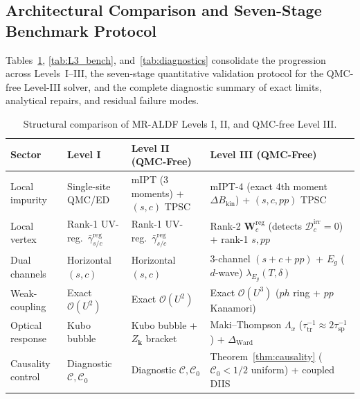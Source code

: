 \documentclass[11pt,a4paper]{article}
\numberwithin{equation}{section}
\theoremstyle{plain}
\theoremstyle{definition}
\providecommand{\vk}{\mathbf{k}}
\begin{document}
\subsection{Architectural Comparison and Seven-Stage Benchmark Protocol}
\label{sec:benchmarks}

Tables~\ref{tab:L3_compare}, \ref{tab:L3_bench}, and~\ref{tab:diagnostics} consolidate
the progression across Levels~I--III, the seven-stage quantitative validation protocol
for the QMC-free Level-III solver, and the complete diagnostic summary of exact limits,
analytical repairs, and residual failure modes.

\begin{table}[htbp]
\centering
\renewcommand{\arraystretch}{1.20}
\caption{Structural comparison of MR-ALDF Levels I, II, and QMC-free Level III.}
\label{tab:L3_compare}
\vspace{0.4em}
\small
\begin{tabular}{p{2.6cm}p{3.2cm}p{3.9cm}p{4.4cm}}
\hline\hline
\textbf{Sector} & \textbf{Level I} & \textbf{Level II (QMC-Free)} & \textbf{Level III (QMC-Free)} \\
\hline
Local impurity & Single-site QMC/ED & mIPT (3 moments) + $(s,c)$ TPSC
    & mIPT-4 (exact 4th moment $\Delta B_{\mathrm{kin}}$) + $(s,c,pp)$ TPSC \\
Local vertex & Rank-1 UV-reg.\ $\bar{\gamma}_{s/c}^{\mathrm{reg}}$
    & Rank-1 UV-reg.\ $\bar{\gamma}_{s/c}^{\mathrm{reg}}$
    & Rank-2 $\mathbf{W}_c^{\mathrm{reg}}$ (detects $\mathcal{D}_c^{\mathrm{irr}} = 0$) + rank-1 $s, pp$ \\
Dual channels & Horizontal $(s,c)$ & Horizontal $(s,c)$
    & 3-channel $(s+c+pp)$ + $E_g$ ($d$-wave) $\lambda_{E_g}(T,\delta)$ \\
Weak-coupling & Exact $\mathcal{O}(U^2)$ & Exact $\mathcal{O}(U^2)$
    & Exact $\mathcal{O}(U^3)$ ($ph$ ring + $pp$ Kanamori) \\
Optical response & Kubo bubble & Kubo bubble + $Z_{\vk}$ bracket
    & Maki--Thompson $\Lambda_x$ ($\tau_{\mathrm{tr}}^{-1} \approx 2\tau_{\mathrm{sp}}^{-1}$) + $\Delta_{\mathrm{Ward}}$ \\
Causality control & Diagnostic $\mathcal{C}, \mathcal{C}_0$ & Diagnostic $\mathcal{C}, \mathcal{C}_0$
    & Theorem~\ref{thm:causality} ($\mathcal{C}_0 < 1/2$ uniform) + coupled DIIS \\
\hline\hline
\end{tabular}
\end{table}
\end{document}
